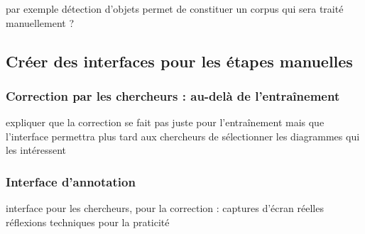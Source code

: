         par exemple détection d'objets permet de constituer un corpus qui sera traité manuellement ?

    \subsection{Créer des interfaces pour les étapes manuelles}
        \subsubsection{Correction par les chercheurs : au-delà de l'entraînement}
        expliquer que la correction se fait pas juste pour l'entraînement mais que l'interface permettra plus tard aux chercheurs de sélectionner les diagrammes qui les intéressent

        \subsubsection{Interface d'annotation}
		interface pour les chercheurs, pour la correction : captures d'écran 
		réelles réflexions techniques pour la praticité 
